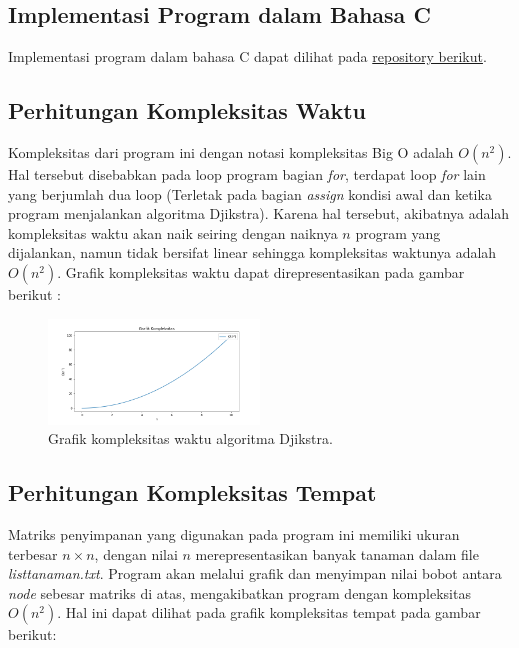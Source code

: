 \documentclass[conference]{IEEEtran}
\begin{document}
\subsection{Implementasi Program dalam Bahasa C}
    Implementasi program dalam bahasa C dapat dilihat
    pada \href{https://github.com/ReynaldoAverill/
    Tugas7PMC}{repository berikut}.

\subsection{Perhitungan Kompleksitas Waktu}
    Kompleksitas dari program ini dengan notasi kompleksitas
    Big O adalah $O(n^2)$. Hal tersebut disebabkan pada loop
    program bagian \textit{for}, terdapat loop \textit{for} lain yang berjumlah
    dua loop (Terletak pada bagian \textit{assign} kondisi awal dan ketika
    program menjalankan algoritma Djikstra). Karena hal tersebut,
    akibatnya adalah kompleksitas waktu akan naik seiring dengan
    naiknya $n$ program yang dijalankan, namun tidak bersifat
    linear sehingga kompleksitas waktunya adalah $O(n^2)$. Grafik
    kompleksitas waktu dapat direpresentasikan pada gambar berikut :

    \begin{figure}[H]
        \centerline{\includegraphics[width=0.5\textwidth]{./sources/onn.png}}
        \caption{Grafik kompleksitas waktu algoritma Djikstra.}
        \label{fig8}
    \end{figure}

\subsection{Perhitungan Kompleksitas Tempat}
    Matriks penyimpanan yang digunakan pada program ini
    memiliki ukuran terbesar $n \times n$, dengan nilai $n$ merepresentasikan banyak tanaman dalam file \textit{listtanaman.txt}. Program
    akan melalui grafik dan menyimpan nilai bobot antara \textit{node}
    sebesar matriks di atas, mengakibatkan program dengan kompleksitas $O(n^2)$. Hal ini dapat dilihat pada grafik kompleksitas
    tempat pada gambar berikut:
\end{document}
